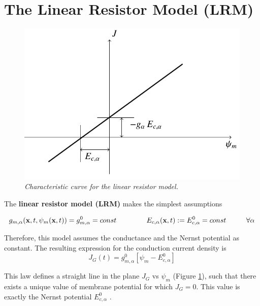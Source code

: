 \documentclass[12pt, a4paper]{report}
\begin{document}
\section{The Linear Resistor Model (LRM)}

\begin{figure}[H]
	\begin{center}
		\includegraphics[scale=0.65]{LRM.png} 
	\end{center} 
	\caption{\textit{Characteristic curve for the linear resistor model.}} \label{LRM}
	
\end{figure}

The \textbf{linear resistor model (LRM)} makes the simplest assumptions 

\begin{equation}
g_{m,\alpha}(\textbf{x},t,\psi_m(\textbf{x},t)) = g_{m,\alpha}^0 = const \hspace{1.5 cm} E_{c,\alpha}(\textbf{x},t) := E_{c,\alpha}^0 = const \hspace{1cm} \forall \alpha
\end{equation}

Therefore, this model assumes the conductance and the Nernst potential as constant.
The resulting expression for the conduction current density is
\begin{equation}
J_G(t) = g_{m,\alpha}^0 [\psi_m -  E_{c,\alpha}^0]
\end{equation}

This law defines a straight line in the plane $J_G$ vs $\psi_m$ (Figure \ref{LRM}), such that there exists a unique value of membrane potential for which $J_G=0$. This value is exactly the Nernst potential $E_{c,\alpha}^0$ .
\end{document}
